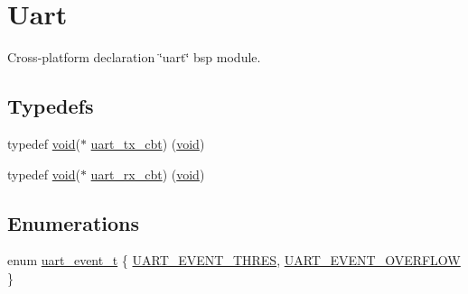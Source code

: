 \hypertarget{group__uart}{}\section{Uart}
\label{group__uart}


Cross-\/platform declaration \char`\"{}uart\char`\"{} bsp module.  


\subsection*{Typedefs}
\begin{DoxyCompactItemize}
\item 
typedef \hyperlink{usb__devapi_8h_afabf60e7f57651d6d595a02c75f07cd0}{void}($\ast$ \hyperlink{group__uart_gae005b96f0b18aecb814f4979c3e33408}{uart\+\_\+tx\+\_\+cbt}) (\hyperlink{usb__devapi_8h_afabf60e7f57651d6d595a02c75f07cd0}{void})
\item 
typedef \hyperlink{usb__devapi_8h_afabf60e7f57651d6d595a02c75f07cd0}{void}($\ast$ \hyperlink{group__uart_gab8f8d6449d6a994dfb5ede3fca7ac4e2}{uart\+\_\+rx\+\_\+cbt}) (\hyperlink{usb__devapi_8h_afabf60e7f57651d6d595a02c75f07cd0}{void})
\end{DoxyCompactItemize}
\subsection*{Enumerations}
\begin{DoxyCompactItemize}
\item 
enum \hyperlink{group__uart_gaf739f04f788018b4b59fb7ad75da0a8d}{uart\+\_\+event\+\_\+t} \{ \hyperlink{group__uart_ggaf739f04f788018b4b59fb7ad75da0a8dad4e17a7ecd06bd3b3af002804023f4c7}{U\+A\+R\+T\+\_\+\+E\+V\+E\+N\+T\+\_\+\+T\+H\+R\+ES}, 
\hyperlink{group__uart_ggaf739f04f788018b4b59fb7ad75da0a8da3b7ab5094830f3a016e40056fe8d0ad0}{U\+A\+R\+T\+\_\+\+E\+V\+E\+N\+T\+\_\+\+O\+V\+E\+R\+F\+L\+OW}
 \}
\end{DoxyCompactItemize}
